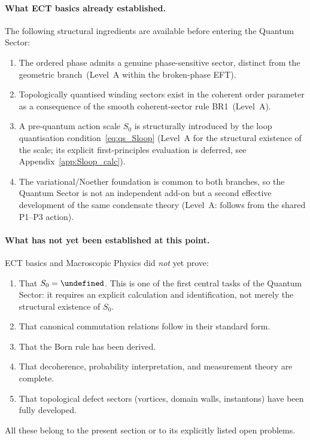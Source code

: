 \documentclass[11pt,a4paper]{article}
\let\hbar\undefined
\numberwithin{equation}{section}
\begin{document}
\paragraph{What ECT basics already established.}
The following structural ingredients are available before
entering the Quantum Sector:
\begin{enumerate}[label=(\roman*)]
  \item The ordered phase admits a genuine phase-sensitive sector,
    distinct from the geometric branch~(Level~A within the
    broken-phase EFT).
  \item Topologically quantised winding sectors exist in the
    coherent order parameter as a consequence of the smooth coherent-sector rule BR1~(Level~A).
  \item A pre-quantum action scale $S_0$ is structurally
    introduced by the loop quantisation condition~\eqref{eq:qs_Sloop}
    (Level~A for the structural existence of the scale;
    its explicit first-principles evaluation is deferred,
    see Appendix~\ref{app:Sloop_calc}).
  \item The variational/Noether foundation is common to both
    branches, so the Quantum Sector is not an independent add-on
    but a second effective development of the same condensate
    theory (Level~A: follows from the shared P1--P3 action).
\end{enumerate}

\paragraph{What has not yet been established at this point.}
ECT basics and Macroscopic Physics did \emph{not} yet prove:
\begin{enumerate}[label=(\roman*)]
  \item That $S_0 = \hbar$.
    This is one of the first central tasks of the Quantum Sector:
    it requires an explicit calculation and identification,
    not merely the structural existence of $S_0$.
  \item That canonical commutation relations follow in their
    standard form.
  \item That the Born rule has been derived.
  \item That decoherence, probability interpretation, and
    measurement theory are complete.
  \item That topological defect sectors (vortices, domain walls,
    instantons) have been fully developed.
\end{enumerate}
All these belong to the present section or to its explicitly
listed open problems.
\end{document}
